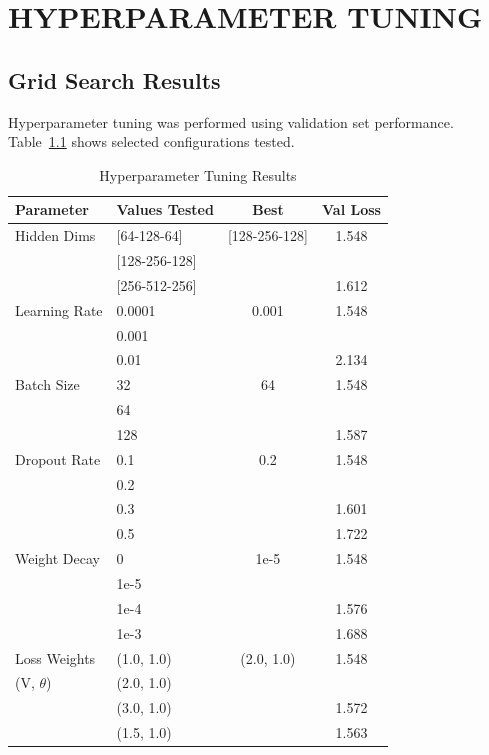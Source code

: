\documentclass[12pt,a4paper]{report}
\begin{document}
\chapter{HYPERPARAMETER TUNING}

\section{Grid Search Results}

Hyperparameter tuning was performed using validation set performance. Table~\ref{tab:hyperparam_tuning} shows selected configurations tested.

\begin{table}[ht]
\centering
\caption{Hyperparameter Tuning Results}
\label{tab:hyperparam_tuning}
\begin{tabular}{llcc}
\toprule
\textbf{Parameter} & \textbf{Values Tested} & \textbf{Best} & \textbf{Val Loss} \\
\midrule
Hidden Dims & [64-128-64] & [128-256-128] & 1.548 \\
 & [128-256-128] & & \\
 & [256-512-256] & & 1.612 \\
\midrule
Learning Rate & 0.0001 & 0.001 & 1.548 \\
 & 0.001 & & \\
 & 0.01 & & 2.134 \\
\midrule
Batch Size & 32 & 64 & 1.548 \\
 & 64 & & \\
 & 128 & & 1.587 \\
\midrule
Dropout Rate & 0.1 & 0.2 & 1.548 \\
 & 0.2 & & \\
 & 0.3 & & 1.601 \\
 & 0.5 & & 1.722 \\
\midrule
Weight Decay & 0 & 1e-5 & 1.548 \\
 & 1e-5 & & \\
 & 1e-4 & & 1.576 \\
 & 1e-3 & & 1.688 \\
\midrule
Loss Weights & (1.0, 1.0) & (2.0, 1.0) & 1.548 \\
(V, $\theta$) & (2.0, 1.0) & & \\
 & (3.0, 1.0) & & 1.572 \\
 & (1.5, 1.0) & & 1.563 \\
\bottomrule
\end{tabular}
\end{table}
\end{document}
